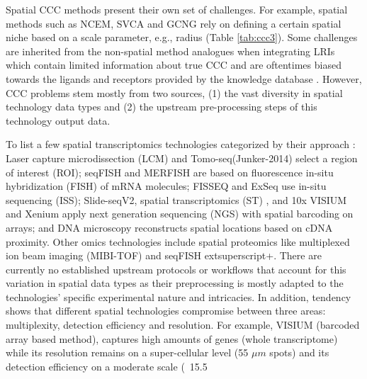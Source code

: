 Spatial CCC methods present their own set of challenges. For example, spatial methods such as NCEM, SVCA and GCNG rely on defining a certain spatial niche based on a scale parameter, e.g., radius (Table \ref{tab:ccc3}). Some challenges are inherited from the non-spatial method analogues when integrating LRIs which contain limited information about true CCC and are oftentimes biased towards the ligands and receptors provided by the knowledge database \cite{Jin-2022}\cite{Dimitrov-2021}. However, CCC problems stem mostly from two sources, (1) the vast diversity in spatial technology data types and (2) the upstream pre-processing steps of this technology output data.

To list a few spatial transcriptomics technologies categorized by their approach \cite{Moses-2022} : Laser capture microdissection (LCM)\cite{Emmert-Buck-1996} and Tomo-seq(Junker-2014) select a region of interest (ROI); seqFISH\cite{Lubeck-2014} and MERFISH\cite{Chen-2015} are based on fluorescence in-situ hybridization (FISH) of mRNA molecules; FISSEQ\cite{Lee-2014} and ExSeq\cite{Alon-2021} use in-situ sequencing (ISS); Slide-seqV2\cite{Marshall-2022}, spatial transcriptomics (ST) \cite{Stahl-2016}, and 10x VISIUM\cite{Moses-2022} and Xenium apply next generation sequencing (NGS) with spatial barcoding on arrays; and DNA microscopy\cite{Weinstein-2019} reconstructs spatial locations based on cDNA proximity. Other omics technologies include spatial proteomics like multiplexed ion beam imaging (MIBI-TOF)\cite{Keren-2019} and seqFISH	extsuperscript{+}\cite{Shah-2018}. There are currently no established upstream protocols or workflows that account for this variation in spatial data types as their preprocessing is mostly adapted to the technologies' specific experimental nature and  intricacies. In addition, tendency shows that different spatial technologies compromise between three areas: multiplexity, detection efficiency and resolution. For example, VISIUM (barcoded array based method), captures high amounts of genes (whole transcriptome) while its resolution remains on a super-cellular level (55 $\mu m$ spots) and its detection efficiency on a moderate scale (~15.5%

